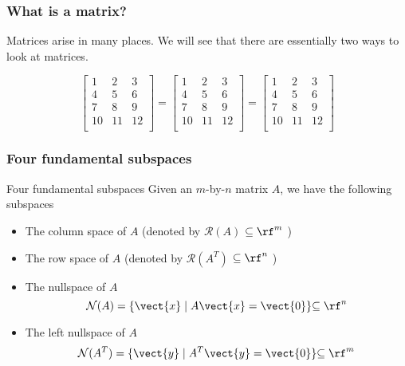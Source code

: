 

\begin{frame}
  \frametitle{What is a matrix?}

  Matrices arise in many places.  We will see that there are
  essentially two ways to look at matrices.
  
  \[
  \left[
    \begin{array}{c|c|c}
      1 & 2 & 3 \\
      4 & 5 & 6 \\
      7 & 8 & 9 \\
      10 & 11 & 12 \\
    \end{array}
    \right]
  =
  \left[
    \begin{array}{ccc}
      1 & 2 & 3 \\
      4 & 5 & 6 \\
      7 & 8 & 9 \\
      10 & 11 & 12 \\
    \end{array}
    \right]
  =
  \left[
    \begin{array}{ccc}
      1 & 2 & 3 \\
      \hline
      4 & 5 & 6 \\
      \hline
      7 & 8 & 9 \\
      \hline
      10 & 11 & 12 \\
    \end{array}
    \right]
  \]
\end{frame}

\begin{frame}
  \frametitle{Four fundamental subspaces}

  \begin{block}{Four fundamental subspaces}
    Given an $m$-by-$n$ matrix $A$, we have the following subspaces
    \begin{itemize}
    \item The column space of $A$ (denoted by ${\mathcal R}(A)$
      {$\subseteq \rf^m$}
      )
    \item The row space of $A$ (denoted by ${\mathcal R}(A^T)$
      {$\subseteq \rf^n$}
      )
    \item The nullspace of $A$
      \[
        {\mathcal N}(A) = \{\vect{x} \;|\; A\vect{x}=\vect{0}\}
        {\subseteq \rf^n}
      \]
    \item The left nullspace of $A$
      \[
        {\mathcal N}(A^T) = \{\vect{y} \;|\; A^T\vect{y}=\vect{0}\}
        {\subseteq \rf^m}
      \]
    \end{itemize}
  \end{block}
\end{frame}

